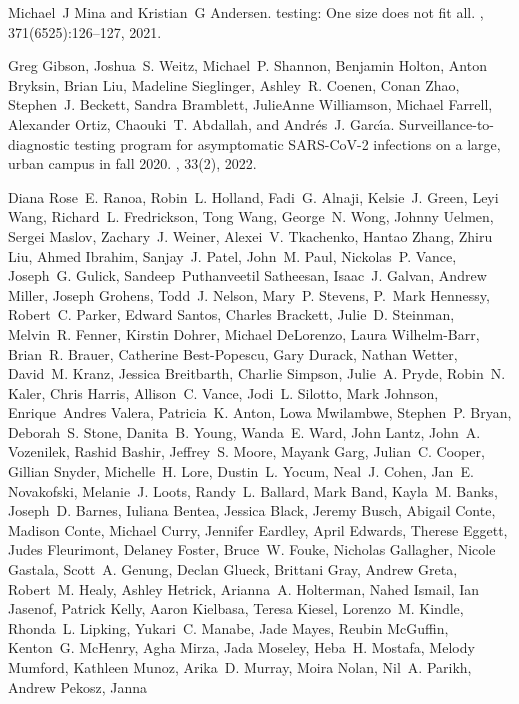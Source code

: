 \documentclass[12pt]{article}
\begin{document}
\begin{thebibliography}{10}
Michael~J Mina and Kristian~G Andersen.
 testing: One size does not fit all.
, 371(6525):126--127, 2021.

Greg Gibson, Joshua~S. Weitz, Michael~P. Shannon, Benjamin Holton, Anton
  Bryksin, Brian Liu, Madeline Sieglinger, Ashley~R. Coenen, Conan Zhao,
  Stephen~J. Beckett, Sandra Bramblett, JulieAnne Williamson, Michael Farrell,
  Alexander Ortiz, Chaouki~T. Abdallah, and Andr{\'e}s~J. Garc{\'\i}a.
\newblock Surveillance-to-diagnostic testing program for asymptomatic
  {SARS-CoV-2} infections on a large, urban campus in fall 2020.
, 33(2), 2022.

Diana Rose~E. Ranoa, Robin~L. Holland, Fadi~G. Alnaji, Kelsie~J. Green, Leyi
  Wang, Richard~L. Fredrickson, Tong Wang, George~N. Wong, Johnny Uelmen,
  Sergei Maslov, Zachary~J. Weiner, Alexei~V. Tkachenko, Hantao Zhang, Zhiru
  Liu, Ahmed Ibrahim, Sanjay~J. Patel, John~M. Paul, Nickolas~P. Vance,
  Joseph~G. Gulick, Sandeep~Puthanveetil Satheesan, Isaac~J. Galvan, Andrew
  Miller, Joseph Grohens, Todd~J. Nelson, Mary~P. Stevens, P.~Mark Hennessy,
  Robert~C. Parker, Edward Santos, Charles Brackett, Julie~D. Steinman,
  Melvin~R. Fenner, Kirstin Dohrer, Michael DeLorenzo, Laura Wilhelm-Barr,
  Brian~R. Brauer, Catherine Best-Popescu, Gary Durack, Nathan Wetter, David~M.
  Kranz, Jessica Breitbarth, Charlie Simpson, Julie~A. Pryde, Robin~N. Kaler,
  Chris Harris, Allison~C. Vance, Jodi~L. Silotto, Mark Johnson, Enrique~Andres
  Valera, Patricia~K. Anton, Lowa Mwilambwe, Stephen~P. Bryan, Deborah~S.
  Stone, Danita~B. Young, Wanda~E. Ward, John Lantz, John~A. Vozenilek, Rashid
  Bashir, Jeffrey~S. Moore, Mayank Garg, Julian~C. Cooper, Gillian Snyder,
  Michelle~H. Lore, Dustin~L. Yocum, Neal~J. Cohen, Jan~E. Novakofski,
  Melanie~J. Loots, Randy~L. Ballard, Mark Band, Kayla~M. Banks, Joseph~D.
  Barnes, Iuliana Bentea, Jessica Black, Jeremy Busch, Abigail Conte, Madison
  Conte, Michael Curry, Jennifer Eardley, April Edwards, Therese Eggett, Judes
  Fleurimont, Delaney Foster, Bruce~W. Fouke, Nicholas Gallagher, Nicole
  Gastala, Scott~A. Genung, Declan Glueck, Brittani Gray, Andrew Greta,
  Robert~M. Healy, Ashley Hetrick, Arianna~A. Holterman, Nahed Ismail, Ian
  Jasenof, Patrick Kelly, Aaron Kielbasa, Teresa Kiesel, Lorenzo~M. Kindle,
  Rhonda~L. Lipking, Yukari~C. Manabe, Jade Mayes, Reubin McGuffin, Kenton~G.
  McHenry, Agha Mirza, Jada Moseley, Heba~H. Mostafa, Melody Mumford, Kathleen
  Munoz, Arika~D. Murray, Moira Nolan, Nil~A. Parikh, Andrew Pekosz, Janna

\end{thebibliography}
\end{document}
